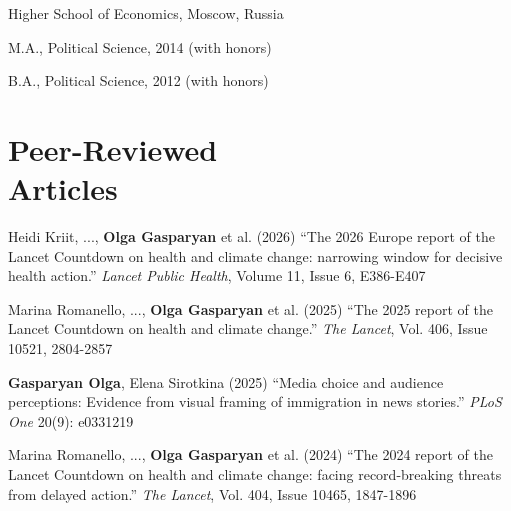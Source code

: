 \documentclass[margin,line,10.95pt]{res}
\newenvironment{list1}{
  \begin{list}{\ding{113}}{%
      \setlength{\itemsep}{0in}
      \setlength{\parsep}{0in} \setlength{\parskip}{0in}
      \setlength{\topsep}{0in} \setlength{\partopsep}{0in}
      \setlength{\leftmargin}{0.17in}}}{\end{list}}
\begin{document}
\begin{resume}
\vspace{-3mm}
{Higher School of Economics, Moscow, Russia}\\
\vspace*{-.1in}
\begin{list1}
 \item[] M.A., Political Science, 2014 (with honors) 
\item[] B.A., Political Science, 2012 (with honors)
\end{list1}



\section{\sc Peer-Reviewed \\ Articles}

Heidi Kriit, ..., \textbf{Olga Gasparyan} et al.  (2026) ``The 2026 Europe report of the Lancet Countdown on health and climate change: narrowing window for decisive health action.'' \textit{Lancet Public Health}, Volume 11, Issue 6, E386-E407

\vspace*{-2.5mm}


Marina Romanello, ..., \textbf{Olga Gasparyan} et al.  (2025) ``The 2025 report of the Lancet Countdown on health and climate change.'' \textit{The Lancet}, Vol. 406, Issue 10521, 2804-2857

\vspace*{-2.5mm}


\textbf{Gasparyan Olga}, Elena Sirotkina (2025) ``Media choice and audience perceptions: Evidence from visual framing of immigration in news stories.'' \textit{PLoS One} 20(9): e0331219 

\vspace*{-2.5mm}


Marina Romanello, ..., \textbf{Olga Gasparyan} et al.  (2024) ``The 2024 report of the Lancet Countdown on health and climate change: facing record-breaking threats from delayed action.'' \textit{The Lancet}, Vol. 404, Issue 10465, 1847-1896



\end{resume}
\end{document}

